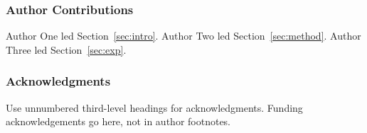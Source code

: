 \documentclass{article} %
\begin{document}




\subsubsection*{Author Contributions}
Author One led Section~\ref{sec:intro}.
Author Two led Section~\ref{sec:method}.
Author Three led Section~\ref{sec:exp}.

\subsubsection*{Acknowledgments}
Use unnumbered third-level headings for acknowledgments. Funding acknowledgements go here, not in author footnotes.




\appendix

\end{document}
